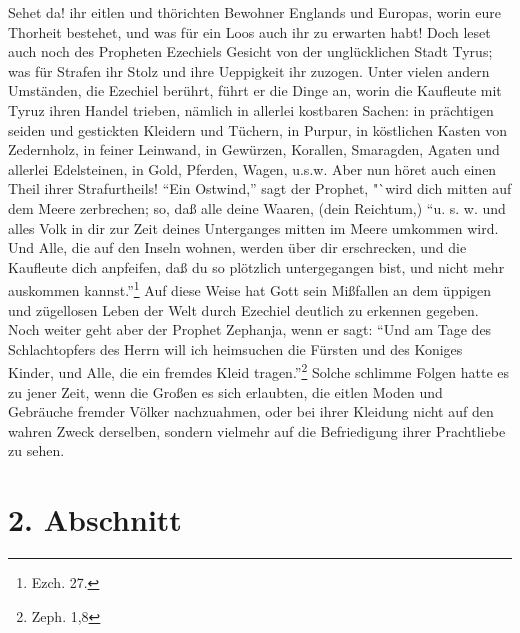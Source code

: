 Sehet da! ihr eitlen und thörichten Bewohner Englands und Europas, worin eure
Thorheit bestehet, und was für ein Loos auch ihr zu erwarten habt! Doch leset
auch noch des Propheten Ezechiels Gesicht von der unglücklichen Stadt Tyrus; was
für Strafen ihr Stolz und ihre Ueppigkeit ihr zuzogen. Unter vielen andern
Umständen, die Ezechiel berührt, führt er die Dinge an, worin die Kaufleute mit
Tyruz ihren Handel trieben, nämlich in allerlei kostbaren Sachen: in prächtigen
seiden und gestickten Kleidern und Tüchern, in Purpur, in köstlichen Kasten von
Zedernholz, in feiner Leinwand, in Gewürzen, Korallen, Smaragden, Agaten und
allerlei Edelsteinen, in Gold, Pferden, Wagen, u.s.w. Aber nun höret auch einen
Theil ihrer Strafurtheils! "`Ein Ostwind,"' sagt der Prophet, "`wird dich mitten
auf dem Meere zerbrechen; so, daß alle deine Waaren, (dein Reichtum,) "`u. s. w.
und alles Volk in dir zur Zeit deines Unterganges mitten im Meere umkommen wird.
Und Alle, die auf den Inseln wohnen, werden über dir erschrecken, und die
Kaufleute dich anpfeifen, daß du so plötzlich untergegangen bist, und nicht mehr
auskommen kannst."'\footnote{Ezch. 27.} Auf diese Weise hat Gott sein Mißfallen
an dem üppigen und zügellosen Leben der Welt durch Ezechiel deutlich zu erkennen
gegeben. Noch weiter geht aber der Prophet Zephanja, wenn er sagt: "`Und am Tage
des Schlachtopfers des Herrn will ich heimsuchen die Fürsten und des Koniges
Kinder, und Alle, die ein fremdes Kleid tragen."'\footnote{Zeph. 1,8} Solche
schlimme Folgen hatte es zu jener Zeit, wenn die Großen es sich erlaubten, die
eitlen Moden und Gebräuche fremder Völker nachzuahmen, oder bei ihrer Kleidung
nicht auf den wahren Zweck derselben, sondern vielmehr auf die Befriedigung
ihrer Prachtliebe zu sehen.

\section{2. Abschnitt}

